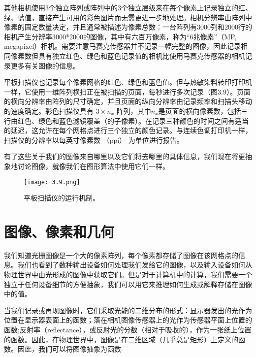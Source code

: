 \documentclass[lang=cn,12pt]{elegantbook}
\begin{document}
其他相机使用3个独立阵列或阵列中的3个独立层级来在每个像素上记录独立的红、绿、蓝值，直接产生可用的彩色图片而无需更进一步地处理。相机分辨率由阵列中像素的固定数量决定，并且通常被描述为像素总数：一台阵列有3000列和2000行的相机产生分辨率3000*2000的图像，其中有六百万像素，称为“6兆像素”（MP, megapixel）相机。需要注意马赛克传感器并不记录一幅完整的图像，因此记录相同像素数但具有独立红色、绿色和蓝色记录值的相机比使用马赛克传感器的相机记录更多有关图像的信息。


平板扫描仪也记录每个像素网格的红色、绿色和蓝色值。但与热敏染料转印打印机一样，它使用一维阵列横扫正在被扫描的页面，每秒进行多次记录（图3.9）。页面的横向分辨率由阵列的尺寸确定，并且页面的纵向分辨率由记录频率和扫描头移动的速度确定。彩色扫描仪具有 $3\times n_x$ 阵列，其中$n_x$是页面的横向像素数，包括三行由红色、绿色和蓝色滤镜覆盖（的子像素）。在记录三种颜色的时间之间有适当的延迟，这允许在每个网格点进行三个独立的颜色记录。与连续色调打印机一样，扫描仪的分辨率以每英寸像素数 （ppi） 为单位进行报告。


有了这些关于我们的图像来自哪里以及它们将去哪里的具体信息，我们现在将更抽象地讨论图像，就像我们在图形算法中使用它们一样。

\begin{figure}[htb]
  \centering
  \texttt{[image: 3.9.png]}
  \caption{平板扫描仪的运行机制。}
\end{figure}

\section{图像、像素和几何}

我们知道光栅图像是一个大的像素阵列，每个像素都存储了图像在该网格点的信息。我们也看到了数种输出设备如何处理我们发给它的图像，以及输入设备如何从物理世界中由光形成的图像中获取它们。但是对于计算机中的计算，我们需要一个独立于任何设备细节的方便抽象，我们可以用它来推理如何生成或解释存储在图像中的值。

当我们记录或再现图像时，它们采取光能的二维分布的形式：显示器发出的光作为位置在显示器表面上的函数；落在相机图像传感器上的光作为传感器平面上位置的函数;反射率（reflectance），或反射光的分数（相对于吸收的），作为一张纸上位置的函数。因此，在物理世界中，图像是在二维区域（几乎总是矩形）上定义的函数。因此，我们可以将图像抽象为函数
\end{document}

